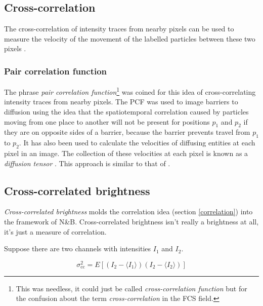 \documentclass[12pt,]{book}
\let\rmarkdownfootnote\footnote%
\def\footnote{\protect\rmarkdownfootnote}
\theoremstyle{definition}
\theoremstyle{definition}
\theoremstyle{definition}
\theoremstyle{remark}
\let\BeginKnitrBlock\begin \let\EndKnitrBlock\end
\begin{document}
\subsection{Cross-correlation}\label{cross-correlation}

The cross-correlation of intensity traces from nearby pixels can be used
to measure the velocity of the movement of the labelled particles
between these two pixels \citep{STICS}.

\subsubsection{Pair correlation function}\label{PCF}

The phrase \emph{pair correlation function}\footnote{This was needless,
  it could just be called \emph{cross-correlation function} but for the
  confusion about the term \emph{cross-correlation} in the FCS field.}
was coined for this idea of cross-correlating intensity traces from
nearby pixels. The PCF was used to image barriers to diffusion
\citep{PCF} using the idea that the spatiotemporal correlation caused by
particles moving from one place to another will not be present for
positions \(p_1\) and \(p_2\) if they are on opposite sides of a
barrier, because the barrier prevents travel from \(p_1\) to \(p_2\). It
has also been used to calculate the velocities of diffusing entities at
each pixel in an image. The collection of these velocities at each pixel
is known as a \emph{diffusion tensor} \citep{DiffusionTensor}. This
approach is similar to that of \citet{STICS}.

\subsection{Cross-correlated
brightness}\label{cross-correlated-brightness}

\emph{Cross-correlated brightness} \citep{ccNB} molds the correlation
idea (section \ref{correlation}) into the framework of N\&B.
Cross-correlated brightness isn't really a brightness at all, it's just
a measure of correlation.

Suppose there are two channels with intensities \(I_1\) and \(I_2\).

\BeginKnitrBlock{definition}[cross-variance]
\protect\hypertarget{def:unnamed-chunk-26}{}{\label{def:unnamed-chunk-26}
\iffalse (cross-variance) \fi{} }

\begin{equation}
\sigma^2_\text{cc} = E[(I_2 - \langle I_1 \rangle)(I_2 - \langle I_2 \rangle)]
\label{eq:cross-var}
\end{equation}
\EndKnitrBlock{definition}
\end{document}

